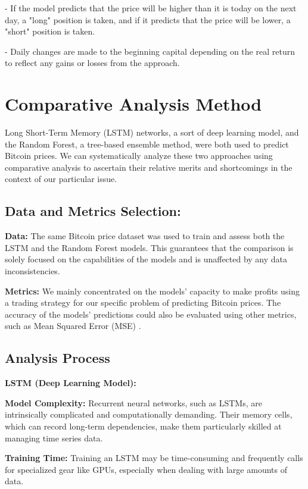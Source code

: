 - If the model predicts that the price will be higher than it is today on the next day, a "long" position is taken, and if it predicts that the price will be lower, a "short" position is taken.

- Daily changes are made to the beginning capital depending on the real return to reflect any gains or losses from the approach.


\section{Comparative Analysis Method}

\goodbreak

Long Short-Term Memory (LSTM) networks, a sort of deep learning model, and the Random Forest, a tree-based ensemble method, were both used to predict Bitcoin prices. We can systematically analyze these two approaches using comparative analysis to ascertain their relative merits and shortcomings in the context of our particular issue.

\subsection{Data and Metrics Selection: }

\textbf{Data:} The same Bitcoin price dataset was used to train and assess both the LSTM and the Random Forest models. This guarantees that the comparison is solely focused on the capabilities of the models and is unaffected by any data inconsistencies.

\textbf{Metrics:} We mainly concentrated on the models' capacity to make profits using a trading strategy for our specific problem of predicting Bitcoin prices. The accuracy of the models' predictions could also be evaluated using other metrics, such as Mean Squared Error (MSE) \citep{DBLP:books/lib/HastieTF09}.

\subsection{Analysis Process}

\textbf{LSTM (Deep Learning Model):}


\textbf{Model Complexity:} Recurrent neural networks, such as LSTMs, are intrinsically complicated and computationally demanding. Their memory cells, which can record long-term dependencies, make them particularly skilled at managing time series data.

\textbf{Training Time:} Training an LSTM may be time-consuming and frequently calls for specialized gear like GPUs, especially when dealing with large amounts of data.

